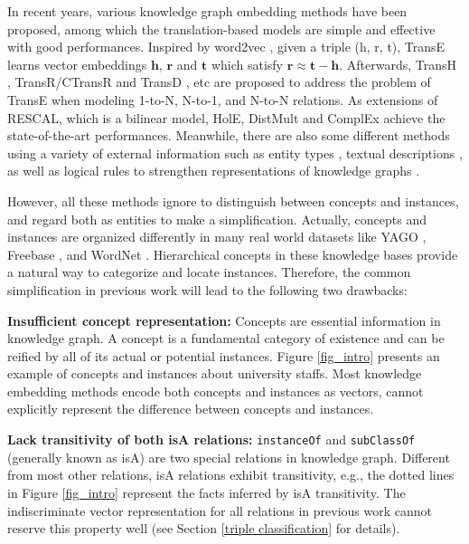 \documentclass[11pt,a4paper]{article}
\begin{document}
  In recent years, various knowledge graph embedding methods have been proposed, among which the translation-based models 
  are simple and effective with good performances. Inspired by word2vec \cite{Word2Vec}, given a triple 
  (h, r, t), TransE learns vector embeddings $\mathbf{h}$, $\mathbf{r}$ and $\mathbf{t}$ which satisfy  
  $\mathbf{r} \approx \mathbf{t} - \mathbf{h}$. Afterwards, 
  TransH \cite{TransH}, TransR/CTransR \cite{TransR} and TransD \cite{TransD}, etc are proposed to address 
  the problem of TransE when modeling 1-to-N, N-to-1, and N-to-N relations. 
  As extensions of RESCAL\cite{RESCAL}, which is a bilinear model, HolE\cite{HolE}, DistMult\cite{DistMult}
  and ComplEx\cite{complEx} achieve the state-of-the-art performances.
  Meanwhile, there are also some different 
  methods using a variety of external information such as entity types \cite{DKRL}, 
  textual descriptions \cite{TEKE}, as well as logical rules to strengthen representations of knowledge graphs \cite{Wang2015Knowledge,Shu2016Jointly,Rockt2015Injecting}. 
  
  However, all these methods ignore to distinguish between concepts and instances, and regard both as entities to make a simplification.
  Actually, concepts and instances are organized differently in many real world datasets like YAGO \cite{YAGO}, Freebase \cite{Freebase},
  and WordNet \cite{Wordnet}. Hierarchical concepts in these knowledge bases provide a natural way to categorize and locate instances.
  Therefore, the common simplification in previous work will lead to the following two drawbacks:
  
  \textbf{Insufficient concept representation:} Concepts are essential information in knowledge graph. A concept is a 
  fundamental category of existence \cite{rosch:natural} and can be reified by all of its actual or potential instances. Figure \ref{fig_intro} presents an example of concepts and instances about university staffs.
  Most knowledge embedding methods encode both concepts and instances as vectors, cannot explicitly represent 
  the difference between concepts and instances.
  
  \textbf{Lack transitivity of both isA relations:} \texttt{instanceOf} and \texttt{subClassOf} (generally known as isA) are two special relations in 
  knowledge graph. Different from most other relations, isA relations exhibit transitivity, e.g., the dotted lines in Figure \ref{fig_intro} represent the facts inferred by isA transitivity. 
  The indiscriminate vector representation for all relations in previous work cannot reserve this property well (see Section \ref{triple classification} for details).
  
\end{document}
